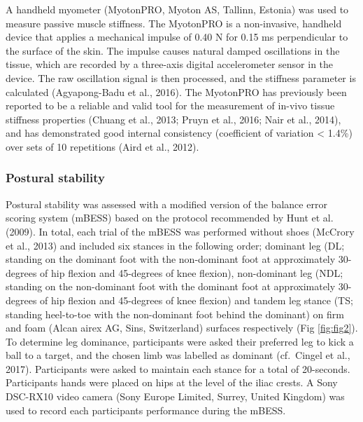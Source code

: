 \documentclass[
]{frontiersHLTH}
\begin{document}
A handheld myometer (MyotonPRO, Myoton AS, Tallinn, Estonia) was used to
measure passive muscle stiffness. The MyotonPRO is a non-invasive,
handheld device that applies a mechanical impulse of 0.40 N for 0.15 ms
perpendicular to the surface of the skin. The impulse causes natural
damped oscillations in the tissue, which are recorded by a three-axis
digital accelerometer sensor in the device. The raw oscillation signal
is then processed, and the stiffness parameter is calculated
(Agyapong-Badu et al., 2016). The MyotonPRO has previously been reported
to be a reliable and valid tool for the measurement of in-vivo tissue
stiffness properties (Chuang et al., 2013; Pruyn et al., 2016; Nair et
al., 2014), and has demonstrated good internal consistency (coefficient
of variation \textless{} 1.4\%) over sets of 10 repetitions (Aird et
al., 2012).

\hypertarget{postural-stability}{%
\subsubsection{Postural stability}\label{postural-stability}}

Postural stability was assessed with a modified version of the balance
error scoring system (mBESS) based on the protocol recommended by Hunt
et al. (2009). In total, each trial of the mBESS was performed without
shoes (McCrory et al., 2013) and included six stances in the following
order; dominant leg (DL; standing on the dominant foot with the
non-dominant foot at approximately 30-degrees of hip flexion and
45-degrees of knee flexion), non-dominant leg (NDL; standing on the
non-dominant foot with the dominant foot at approximately 30-degrees of
hip flexion and 45-degrees of knee flexion) and tandem leg stance (TS;
standing heel-to-toe with the non-dominant foot behind the dominant) on
firm and foam (Alcan airex AG, Sins, Switzerland) surfaces respectively
(Fig \ref{fig:fig2}). To determine leg dominance, participants were
asked their preferred leg to kick a ball to a target, and the chosen
limb was labelled as dominant (cf.~Cingel et al., 2017). Participants
were asked to maintain each stance for a total of 20-seconds.
Participants hands were placed on hips at the level of the iliac crests.
A Sony DSC-RX10 video camera (Sony Europe Limited, Surrey, United
Kingdom) was used to record each participants performance during the
mBESS.
\end{document}
